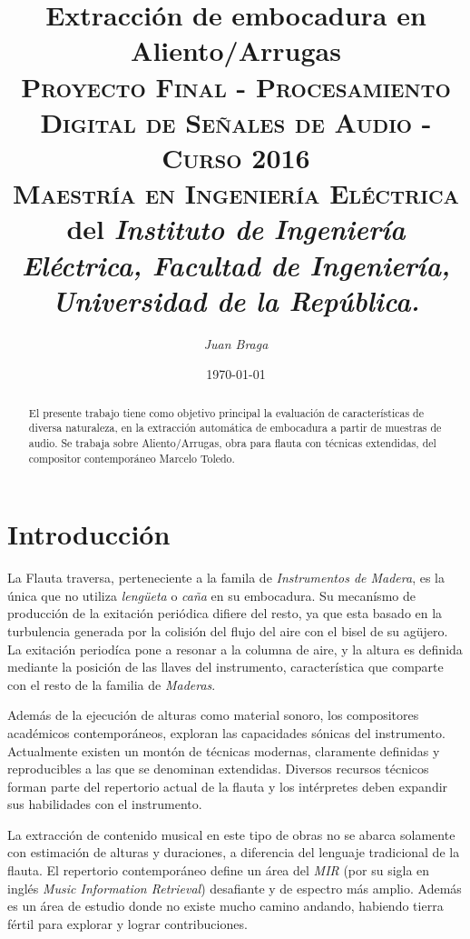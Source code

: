 \documentclass{article}
\title{\textbf{Extracción de embocadura en Aliento/Arrugas}\\\large \textsc{Proyecto Final - Procesamiento Digital de Señales de Audio - Curso 2016}\\
 \textsc{Maestría en Ingeniería Eléctrica} del \textit{Instituto de Ingeniería Eléctrica, Facultad de Ingeniería, Universidad de la República.}}
\author{\textit{Juan Braga}}
\date{\today}
\begin{document}
\maketitle 


\begin{abstract}
El presente trabajo tiene como objetivo principal la evaluación de características de diversa naturaleza, en la extracción automática de embocadura a partir de muestras de audio. Se trabaja sobre Aliento/Arrugas, obra para flauta con técnicas extendidas, del compositor contemporáneo Marcelo Toledo. 
\end{abstract}






\section{Introducción}

La Flauta traversa, perteneciente a la famila de \textit{Instrumentos de Madera}, es la única que no utiliza \textit{lengüeta} o \textit{caña} en su embocadura. Su mecanísmo de producción de la exitación periódica difiere del resto, ya que esta basado en la turbulencia generada por la colisión del flujo del aire con el bisel de su agüjero. La exitación periodíca pone a resonar a la columna de aire, y la altura es definida mediante la posición de las llaves del instrumento, característica que comparte con el resto de la familia de \textit{Maderas}. 
\medskip 

Además de la ejecución de alturas como material sonoro, los compositores académicos contemporáneos, exploran las capacidades sónicas del instrumento. Actualmente existen un montón de técnicas modernas, claramente definidas y reproducibles a las que se denominan extendidas. Diversos recursos técnicos forman parte del repertorio actual de la flauta y los intérpretes deben expandir sus habilidades con el instrumento.
\medskip

La extracción de contenido musical en este tipo de obras no se abarca solamente con estimación de alturas y duraciones, a diferencia del lenguaje tradicional de la flauta. El repertorio contemporáneo define un área del \textit{MIR} (por su sigla en inglés \textit{Music Information Retrieval}) desafiante y de espectro más amplio. Además es un área de estudio donde no existe mucho camino andando, habiendo tierra fértil para explorar y lograr contribuciones. 
\medskip
\end{document}
